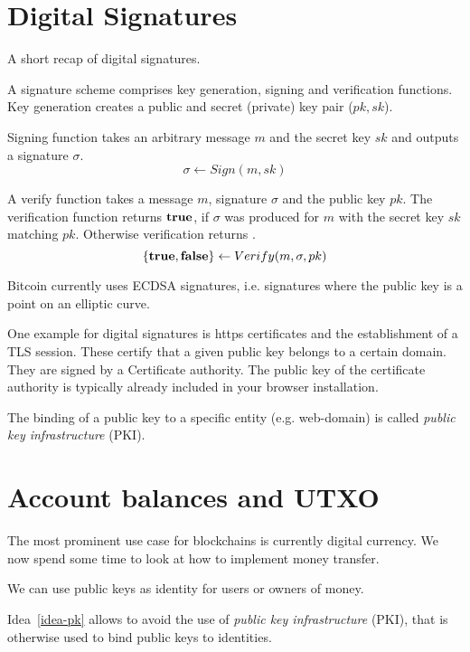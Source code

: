 
\section{Digital Signatures}
A short recap of digital signatures.

A signature scheme comprises key generation, signing and verification functions.
Key generation creates a public and secret (private) key pair ($pk, sk$).

Signing function takes an arbitrary message $m$ and the secret key $sk$ and outputs a signature $\sigma$.
\[
\sigma\leftarrow Sign(m,sk)
\]

A verify function takes a message $m$, signature $\sigma$ and the public key $pk$. The verification function returns $\textbf{true}$, if $\sigma$ was produced for $m$ with the secret key $sk$ matching $pk$. Otherwise verification returns \false.
\[
\{ \textbf{true}, \textbf{false} \} \leftarrow Verify(m,\sigma,pk)
\]

Bitcoin currently uses ECDSA signatures, i.e. signatures where the public key is a point on an elliptic curve.

\begin{example}
One example for digital signatures is https certificates and the establishment of a TLS session.
These certify that a given public key belongs to a certain domain.
They are signed by a Certificate authority. 
The public key of the certificate authority is typically already included in your browser installation.

The binding of a public key to a specific entity (e.g. web-domain) is called 
\emph{public key infrastructure} (PKI).
\end{example}

\section{Account balances and UTXO}
The most prominent use case for blockchains is currently digital currency. 
We now spend some time to look at how to implement money transfer. 


\begin{idea}
	\label{idea-pk}
	We can use public keys as identity for users or owners of money. 
\end{idea}
\begin{note}
Idea~\ref{idea-pk} allows to avoid the use of \emph{public key infrastructure} (PKI), that is otherwise used to bind public keys to identities.
\end{note}


